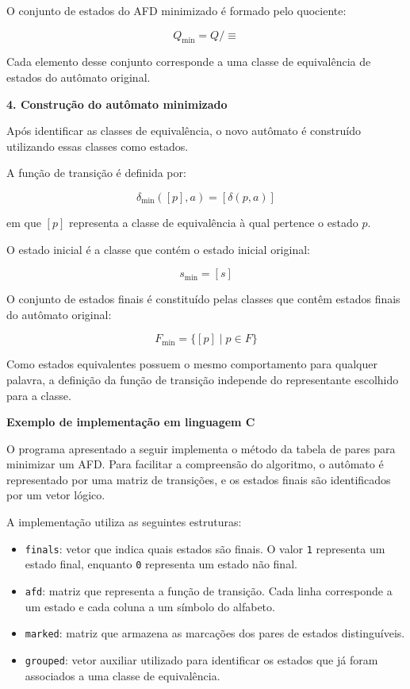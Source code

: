\documentclass[
  brazilian,
  letterpaper,
]{book}
\providecommand{\tightlist}{%
  \setlength{\itemsep}{0pt}\setlength{\parskip}{0pt}}
\theoremstyle{plain}
\theoremstyle{definition}
\theoremstyle{remark}
\begin{document}
O conjunto de estados do AFD minimizado é formado pelo quociente:

\[
Q_{\min} = Q/{\equiv}
\]

Cada elemento desse conjunto corresponde a uma classe de equivalência de
estados do autômato original.

\textbf{4. Construção do autômato minimizado}

Após identificar as classes de equivalência, o novo autômato é
construído utilizando essas classes como estados.

A função de transição é definida por:

\[
\delta_{\min}([p],a) = [\delta(p,a)]
\]

em que \([p]\) representa a classe de equivalência à qual pertence o
estado \(p\).

O estado inicial é a classe que contém o estado inicial original:

\[
s_{\min} = [s]
\]

O conjunto de estados finais é constituído pelas classes que contêm
estados finais do autômato original:

\[
F_{\min} = \{[p] \mid p \in F\}
\]

Como estados equivalentes possuem o mesmo comportamento para qualquer
palavra, a definição da função de transição independe do representante
escolhido para a classe.

\textbf{Exemplo de implementação em linguagem C}

O programa apresentado a seguir implementa o método da tabela de pares
para minimizar um AFD. Para facilitar a compreensão do algoritmo, o
autômato é representado por uma matriz de transições, e os estados
finais são identificados por um vetor lógico.

A implementação utiliza as seguintes estruturas:

\begin{itemize}
\tightlist
\item
  \texttt{finals}: vetor que indica quais estados são finais. O valor
  \texttt{1} representa um estado final, enquanto \texttt{0} representa
  um estado não final.
\item
  \texttt{afd}: matriz que representa a função de transição. Cada linha
  corresponde a um estado e cada coluna a um símbolo do alfabeto.
\item
  \texttt{marked}: matriz que armazena as marcações dos pares de estados
  distinguíveis.
\item
  \texttt{grouped}: vetor auxiliar utilizado para identificar os estados
  que já foram associados a uma classe de equivalência.
\end{itemize}
\end{document}
